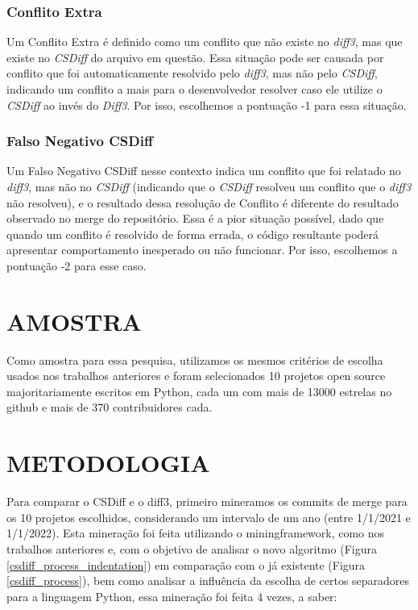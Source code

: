 \subsubsection{Conflito Extra}
Um Conflito Extra é definido como um conflito que não existe
no \emph{diff3}, mas que existe no \emph{CSDiff} do arquivo em questão. Essa
situação pode ser causada por conflito que foi automaticamente
resolvido pelo \emph{diff3}, mas não pelo \emph{CSDiff}, indicando um conflito
a mais para o desenvolvedor resolver caso ele utilize o \emph{CSDiff}
ao invés do \emph{Diff3}. Por isso, escolhemos a pontuação -1 para essa
situação.
\subsubsection{Falso Negativo CSDiff}
Um Falso Negativo CSDiff nesse contexto indica um conflito que foi relatado no
\emph{diff3}, mas não no \emph{CSDiff} (indicando que
o \emph{CSDiff} resolveu um conflito que o \emph{diff3} não resolveu),
e o resultado dessa resolução de Conflito é diferente do resultado
observado no merge do repositório. Essa é a pior situação possível,
dado que quando um conflito é resolvido de forma errada,
o código resultante poderá apresentar comportamento inesperado ou não funcionar. Por
isso, escolhemos a pontuação -2 para esse caso.

\section{AMOSTRA}
Como amostra para essa pesquisa, utilizamos os mesmos critérios de escolha
usados nos trabalhos anteriores e foram selecionados 10 projetos open source majoritariamente escritos em Python,
cada um com mais de 13000 estrelas no github e mais de 370 contribuidores cada.

\section{METODOLOGIA}\label{metodologia}
Para comparar o CSDiff e o diff3, primeiro mineramos os commits de merge para os 10 projetos escolhidos, considerando um
intervalo de um ano (entre 1/1/2021 e 1/1/2022). Esta mineração foi feita utilizando o miningframework, como nos trabalhos
anteriores e, com o objetivo de analisar o novo algoritmo (Figura \ref{csdiff_process_indentation}) em comparação com o já
existente (Figura \ref{csdiff_process}), bem como analisar a influência da escolha de certos separadores para a linguagem Python,
essa mineração foi feita 4 vezes, a saber:

